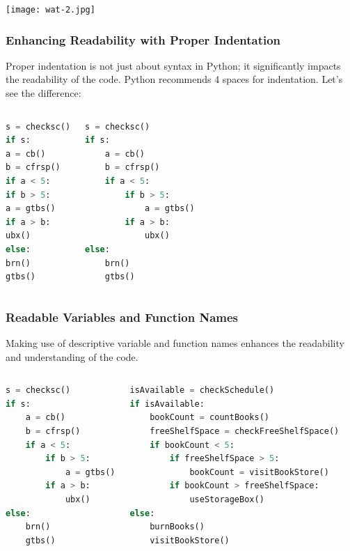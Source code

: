 \begin{frame}[plain]
\texttt{[image: wat-2.jpg]}
\end{frame}

\begin{frame}[fragile]
 \frametitle{Enhancing Readability with Proper Indentation}
 Proper indentation is not just about syntax in Python; it significantly impacts the readability of the code. Python recommends 4 spaces for indentation. Let's see the difference:
 \pause
 \begin{columns}[T]
     \begin{lstlisting}[language=Python,basicstyle=\small]
s = checksc()
if s:
a = cb()
b = cfrsp()
if a < 5:
if b > 5:
a = gtbs()
if a > b:
ubx()
else:
brn()
gtbs()
 \end{lstlisting}
     \begin{lstlisting}[language=Python,basicstyle=\small]
s = checksc()
if s:
    a = cb()
    b = cfrsp()
    if a < 5:
        if b > 5:
            a = gtbs()
        if a > b:
            ubx()
else:
    brn()
    gtbs()
 \end{lstlisting}
 \end{columns}
\end{frame}

\begin{frame}[fragile]
 \frametitle{Readable Variables and Function Names}
 Making use of descriptive variable and function names enhances the readability and understanding of the code. 
 \begin{columns}[T]
\begin{lstlisting}[language=Python, basicstyle=\scriptsize]
s = checksc()
if s:
    a = cb()
    b = cfrsp()
    if a < 5:
        if b > 5:
            a = gtbs()
        if a > b:
            ubx()
else:
    brn()
    gtbs()
 \end{lstlisting}
     \begin{lstlisting}[language=Python, basicstyle=\scriptsize]
isAvailable = checkSchedule()
if isAvailable:
    bookCount = countBooks()
    freeShelfSpace = checkFreeShelfSpace()
    if bookCount < 5:
        if freeShelfSpace > 5:
            bookCount = visitBookStore()
        if bookCount > freeShelfSpace:
            useStorageBox()
else:
    burnBooks()
    visitBookStore()
 \end{lstlisting}
 \end{columns}
\end{frame}

